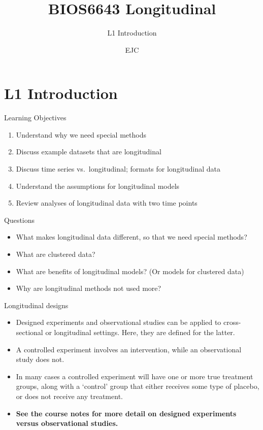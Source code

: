 \documentclass[
  9pt,
  ignorenonframetext,
]{beamer}
\title{BIOS6643 Longitudinal}
\subtitle{L1 Introduction}
\author{EJC}
\date{}
\institute{Department of Biostatistics \& Informatics}
\begin{document}
\frame{\titlepage}

\begin{frame}[allowframebreaks]
  \tableofcontents[hideallsubsections]
\end{frame}
\hypertarget{l1-introduction}{%
\section{L1 Introduction}\label{l1-introduction}}

\begin{frame}{Learning Objectives}
\protect\hypertarget{learning-objectives}{}
\begin{enumerate}
\item
  Understand why we need special methods
\item
  Discuss example datasets that are longitudinal
\item
  Discuss time series vs.~longitudinal; formats for longitudinal data
\item
  Understand the assumptions for longitudinal models
\item
  Review analyses of longitudinal data with two time points
\end{enumerate}

\vspace{\baselineskip}

\begin{block}{Questions}
\protect\hypertarget{questions}{}
\begin{itemize}
\item
  What makes longitudinal data different, so that we need special
  methods?
\item
  What are clustered data?
\item
  What are benefits of longitudinal models? (Or models for clustered
  data)
\item
  Why are longitudinal methods not used more?
\end{itemize}
\end{block}
\end{frame}

\begin{frame}{Longitudinal designs}
\protect\hypertarget{longitudinal-designs}{}
\begin{itemize}
\item
  Designed experiments and observational studies can be applied to
  cross-sectional or longitudinal settings. Here, they are defined for
  the latter.
\item
  A controlled experiment involves an intervention, while an
  observational study does not.
\item
  In many cases a controlled experiment will have one or more true
  treatment groups, along with a `control' group that either receives
  some type of placebo, or does not receive any treatment.
\item
  \textbf{See the course notes for more detail on designed experiments
  versus observational studies.}
\end{itemize}
\end{frame}
\end{document}

